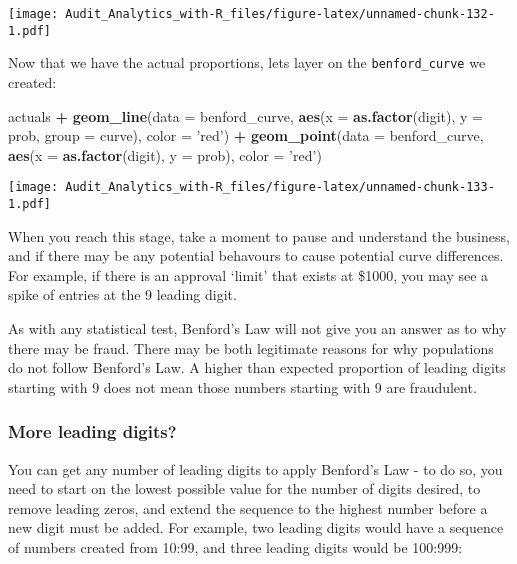 \documentclass[
]{book}
\newenvironment{Shaded}{\begin{snugshade}}{\end{snugshade}}
\newcommand{\DataTypeTok}[1]{\textcolor[rgb]{0.13,0.29,0.53}{#1}}
\newcommand{\KeywordTok}[1]{\textcolor[rgb]{0.13,0.29,0.53}{\textbf{#1}}}
\newcommand{\NormalTok}[1]{#1}
\newcommand{\OperatorTok}[1]{\textcolor[rgb]{0.81,0.36,0.00}{\textbf{#1}}}
\newcommand{\StringTok}[1]{\textcolor[rgb]{0.31,0.60,0.02}{#1}}
\begin{document}
\texttt{[image: Audit\_Analytics\_with-R\_files/figure-latex/unnamed-chunk-132-1.pdf]}

Now that we have the actual proportions, lets layer on the \texttt{benford\_curve} we created:

\begin{Shaded}
\begin{Highlighting}[]
\NormalTok{actuals }\OperatorTok{+}
\StringTok{  }\KeywordTok{geom_line}\NormalTok{(}\DataTypeTok{data =}\NormalTok{ benford_curve, }\KeywordTok{aes}\NormalTok{(}\DataTypeTok{x =} \KeywordTok{as.factor}\NormalTok{(digit), }\DataTypeTok{y =}\NormalTok{ prob, }\DataTypeTok{group =}\NormalTok{ curve), }\DataTypeTok{color =} \StringTok{'red'}\NormalTok{) }\OperatorTok{+}\StringTok{ }
\StringTok{  }\KeywordTok{geom_point}\NormalTok{(}\DataTypeTok{data =}\NormalTok{ benford_curve, }\KeywordTok{aes}\NormalTok{(}\DataTypeTok{x =} \KeywordTok{as.factor}\NormalTok{(digit), }\DataTypeTok{y =}\NormalTok{ prob), }\DataTypeTok{color =} \StringTok{'red'}\NormalTok{)}
\end{Highlighting}
\end{Shaded}

\texttt{[image: Audit\_Analytics\_with-R\_files/figure-latex/unnamed-chunk-133-1.pdf]}

When you reach this stage, take a moment to pause and understand the business, and if there may be any potential behavours to cause potential curve differences. For example, if there is an approval `limit' that exists at \$1000, you may see a spike of entries at the 9 leading digit.

As with any statistical test, Benford's Law will not give you an answer as to why there may be fraud. There may be both legitimate reasons for why populations do not follow Benford's Law. A higher than expected proportion of leading digits starting with 9 does not mean those numbers starting with 9 are fraudulent.

\hypertarget{more-leading-digits}{%
\subsubsection{More leading digits?}\label{more-leading-digits}}

You can get any number of leading digits to apply Benford's Law - to do so, you need to start on the lowest possible value for the number of digits desired, to remove leading zeros, and extend the sequence to the highest number before a new digit must be added. For example, two leading digits would have a sequence of numbers created from 10:99, and three leading digits would be 100:999:
\end{document}
